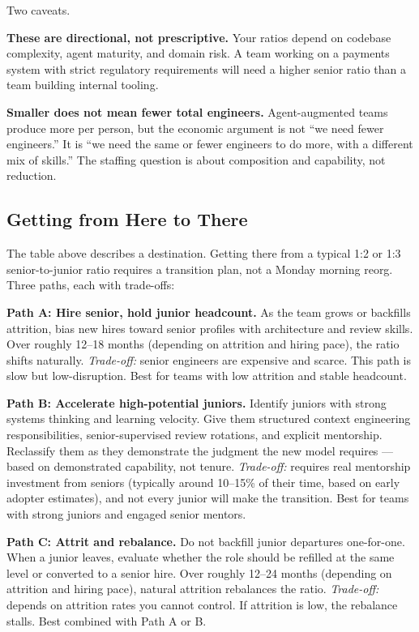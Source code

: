 \documentclass[
  a4paper,
  DIV=11,
  numbers=noendperiod]{scrreprt}
\begin{document}
Two caveats.

\textbf{These are directional, not prescriptive.} Your ratios depend on
codebase complexity, agent maturity, and domain risk. A team working on
a payments system with strict regulatory requirements will need a higher
senior ratio than a team building internal tooling.

\textbf{Smaller does not mean fewer total engineers.} Agent-augmented
teams produce more per person, but the economic argument is not ``we
need fewer engineers.'' It is ``we need the same or fewer engineers to
do more, with a different mix of skills.'' The staffing question is
about composition and capability, not reduction.

\subsection{Getting from Here to
There}\label{getting-from-here-to-there}

The table above describes a destination. Getting there from a typical
1:2 or 1:3 senior-to-junior ratio requires a transition plan, not a
Monday morning reorg. Three paths, each with trade-offs:

\textbf{Path A: Hire senior, hold junior headcount.} As the team grows
or backfills attrition, bias new hires toward senior profiles with
architecture and review skills. Over roughly 12--18 months (depending on
attrition and hiring pace), the ratio shifts naturally.
\emph{Trade-off:} senior engineers are expensive and scarce. This path
is slow but low-disruption. Best for teams with low attrition and stable
headcount.

\textbf{Path B: Accelerate high-potential juniors.} Identify juniors
with strong systems thinking and learning velocity. Give them structured
context engineering responsibilities, senior-supervised review
rotations, and explicit mentorship. Reclassify them as they demonstrate
the judgment the new model requires --- based on demonstrated
capability, not tenure. \emph{Trade-off:} requires real mentorship
investment from seniors (typically around 10--15\% of their time, based
on early adopter estimates), and not every junior will make the
transition. Best for teams with strong juniors and engaged senior
mentors.

\textbf{Path C: Attrit and rebalance.} Do not backfill junior departures
one-for-one. When a junior leaves, evaluate whether the role should be
refilled at the same level or converted to a senior hire. Over roughly
12--24 months (depending on attrition and hiring pace), natural
attrition rebalances the ratio. \emph{Trade-off:} depends on attrition
rates you cannot control. If attrition is low, the rebalance stalls.
Best combined with Path A or B.
\end{document}
